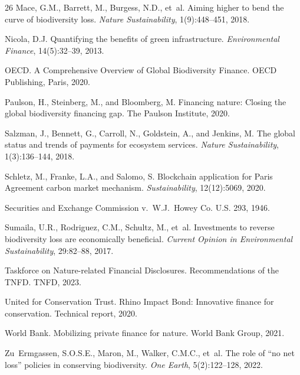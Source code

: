 \documentclass[11pt,a4paper]{article}
\begin{document}
\begin{thebibliography}{26}
Mace, G.M., Barrett, M., Burgess, N.D., et~al.
\newblock Aiming higher to bend the curve of biodiversity loss.
\newblock \emph{Nature Sustainability}, 1(9):448--451, 2018.

Nicola, D.J.
\newblock Quantifying the benefits of green infrastructure.
\newblock \emph{Environmental Finance}, 14(5):32--39, 2013.

OECD.
\newblock A Comprehensive Overview of Global Biodiversity Finance.
\newblock OECD Publishing, Paris, 2020.

Paulson, H., Steinberg, M., and Bloomberg, M.
\newblock Financing nature: Closing the global biodiversity financing gap.
\newblock The Paulson Institute, 2020.

Salzman, J., Bennett, G., Carroll, N., Goldstein, A., and Jenkins, M.
\newblock The global status and trends of payments for ecosystem services.
\newblock \emph{Nature Sustainability}, 1(3):136--144, 2018.

Schletz, M., Franke, L.A., and Salomo, S.
\newblock Blockchain application for Paris Agreement carbon market mechanism.
\newblock \emph{Sustainability}, 12(12):5069, 2020.

Securities and Exchange Commission v.\ W.J.\ Howey Co.
 U.S. 293, 1946.

Sumaila, U.R., Rodriguez, C.M., Schultz, M., et~al.
\newblock Investments to reverse biodiversity loss are economically beneficial.
\newblock \emph{Current Opinion in Environmental Sustainability}, 29:82--88, 2017.

Taskforce on Nature-related Financial Disclosures.
\newblock Recommendations of the TNFD.
\newblock TNFD, 2023.

United for Conservation Trust.
\newblock Rhino Impact Bond: Innovative finance for conservation.
\newblock Technical report, 2020.

World Bank.
\newblock Mobilizing private finance for nature.
\newblock World Bank Group, 2021.

Zu~Ermgassen, S.O.S.E., Maron, M., Walker, C.M.C., et~al.
\newblock The role of ``no net loss'' policies in conserving biodiversity.
\newblock \emph{One Earth}, 5(2):122--128, 2022.


\end{thebibliography}
\end{document}
